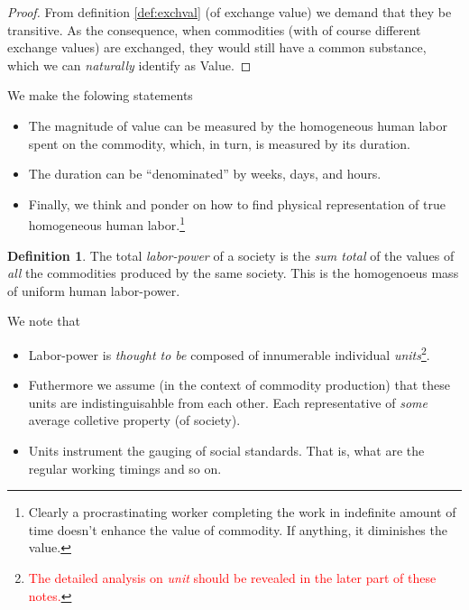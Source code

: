 \documentclass[12pt]{extarticle}
\theoremstyle{definition}
\newtheorem{definition}{Definition}[section]
\newenvironment{remark}[1][Remark]{\begin{trivlist}
\item[\hskip \labelsep {\bfseries #1}]}{\end{trivlist}}
\begin{document}
      \begin{proof}
        From definition \ref{def:exchval} (of exchange value) we demand that they be transitive.  As the consequence, when commodities (with of course different exchange values) are exchanged, they would still have a common substance, which we can \emph{naturally} identify as Value. 
      \end{proof}

      \begin{remark}
        We make the folowing statements
        \begin{itemize}
        \item The magnitude of value can be measured by the homogeneous human labor spent on the commodity, which, in turn, is measured by its duration.
        \item The duration can be ``denominated'' by weeks, days, and hours.
          \item Finally, we think and ponder on how to find physical representation of true homogeneous human labor.\footnote{Clearly a procrastinating worker completing the work in indefinite amount of time doesn't enhance the value of commodity.  If anything, it diminishes the value.}  
          \end{itemize} 
        \end{remark}

        \begin{definition}
          The total \emph{labor-power} of a society is the \emph{sum total} of the values of \emph{all} the commodities produced by the same society.  This is the homogenoeus mass of uniform human labor-power.
        \end{definition}

        \begin{remark}
          We note that
          \begin{itemize}
          \item Labor-power is \emph{thought to be} composed of innumerable individual \emph{units}\footnote{\textcolor{red}{The detailed analysis on \emph{unit} should be revealed in the later part of these notes.}}.
            \item Futhermore we assume (in the context of commodity production) that these units are indistinguisahble from each other.  Each representative of \emph{some} average colletive property (of society).
            \item Units instrument the gauging of social standards.  That is, what are the regular working timings and so on.
          \end{itemize}
        \end{remark}
        
\end{document}
